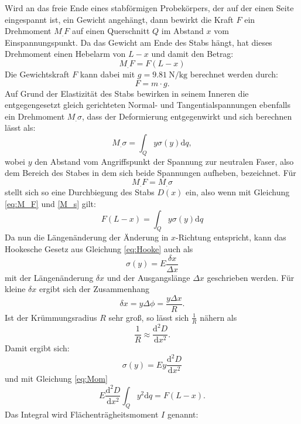 Wird an das freie Ende eines stabförmigen Probekörpers, der auf der einen Seite eingespannt ist, ein Gewicht angehängt, dann bewirkt die Kraft $F$ ein Drehmoment $M_.F$ auf einen Querschnitt $Q$ im Abstand $x$ vom Einspannungspunkt.
Da das Gewicht am Ende des Stabs hängt, hat dieses Drehmoment einen Hebelarm von $L-x$ und damit den Betrag:
\begin{equation}
M_.F = F(L-x) \label{eq:M_F}
\end{equation}
Die Gewichtskraft $F$ kann dabei mit $g=\SI{9.81}{\newton\per\kilogram}$ \cite{g} berechnet werden durch:
\begin{equation}
	F = m \cdot g \text{.} \label{eq:F}
\end{equation}
Auf Grund der Elastizität des Stabs bewirken in seinem Inneren die entgegengesetzt gleich gerichteten Normal- und Tangentialspannungen ebenfalls ein Drehmoment $M_.{\sigma}$, dass der Deformierung entgegenwirkt und sich berechnen lässt als:
\begin{equation}
M_.{\sigma} = \int_Q y \sigma (y) \mathrm{d}q, \label{M_s}
\end{equation}
wobei $y$ den Abstand vom Angriffspunkt der Spannung zur neutralen Faser, also dem Bereich des Stabes in dem sich beide Spannungen aufheben, bezeichnet.
Für
\begin{equation*}
M_.F = M_.{\sigma}
\end{equation*}
stellt sich so eine Durchbiegung des Stabs $D(x)$ ein, also wenn mit Gleichung \eqref{eq:M_F} und \eqref{M_s} gilt:
\begin{equation}
F(L-x) = \int_Q y \sigma (y) \mathrm{d}q \label{eq:Mom}
\end{equation}
Da nun die Längenänderung der Änderung in $x$-Richtung entspricht, kann das Hookesche Gesetz aus Gleichung \eqref{eq:Hooke} auch als 
\[
\sigma (y) = E \frac{\delta x}{\Delta x} 
\]
mit der Längenänderung $\delta x$ und der Ausgangslänge $\Delta x$ geschrieben werden.
Für kleine $\delta x$ ergibt sich der Zusammenhang 
\[
\delta x = y \Delta\phi = \frac{y\Delta x}{R} \text{.}
\]
Ist der Krümmungsradius $R$ sehr groß, so lässt sich $\frac{1}{R}$ nähern als
\[
\frac{1}{R}\approx \frac{\mathrm{d}^2D}{\mathrm{d}x^2}\text{.}
\]
Damit ergibt sich:
\[
\sigma (y) = E y \frac{\mathrm{d}^2D}{\mathrm{d}x^2}
\]
und mit Gleichung \eqref{eq:Mom}
\begin{equation}
E \frac{\mathrm{d}^2D}{\mathrm{d}x^2} \int_Q y^2 \mathrm{d}q = F(L-x)\text{.} \label{eq:Mom2}
\end{equation}
Das Integral wird Flächenträgheitsmoment $I$ genannt:

